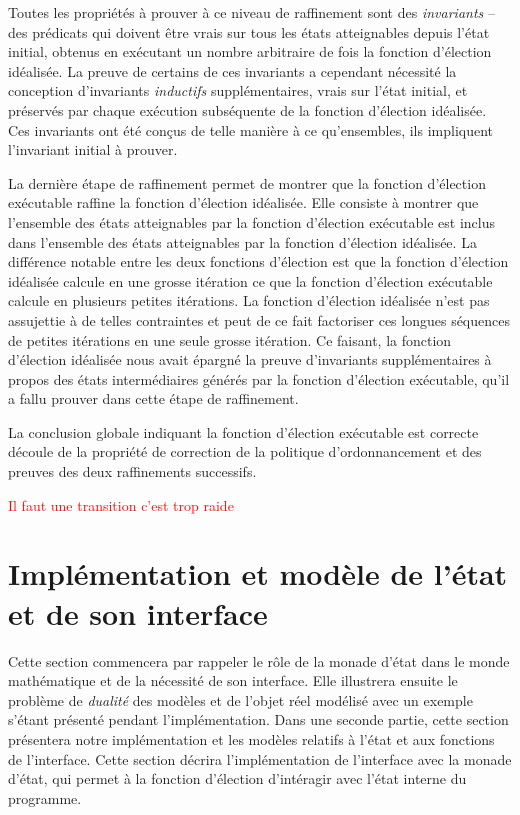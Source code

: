 	Toutes les propriétés à prouver à ce niveau de raffinement sont des \emph{invariants} -- des prédicats qui doivent être vrais sur tous les états atteignables depuis l'état initial, obtenus en exécutant un nombre arbitraire de fois la fonction d'élection idéalisée. La preuve de certains de ces invariants a cependant nécessité la conception d'invariants \emph{inductifs} supplémentaires, vrais sur l'état initial, et préservés par chaque exécution subséquente de la fonction d'élection idéalisée. Ces invariants ont été conçus de telle manière à ce qu'ensembles, ils impliquent l'invariant initial à prouver.

	La dernière étape de raffinement permet de montrer que la fonction d'élection exécutable raffine la fonction d'élection idéalisée. Elle consiste à montrer que l'ensemble des états atteignables par la fonction d'élection exécutable est inclus dans l'ensemble des états atteignables par la fonction d'élection idéalisée. 
	La différence notable entre les deux fonctions d'élection est que la fonction d'élection idéalisée calcule en une grosse itération ce que la fonction d'élection exécutable calcule en plusieurs petites itérations. La fonction d'élection idéalisée n'est pas assujettie à de telles contraintes et peut de ce fait factoriser ces longues séquences de petites itérations en une seule grosse itération. Ce faisant, la fonction d'élection idéalisée nous avait épargné la preuve d'invariants supplémentaires à propos des états intermédiaires générés par la fonction d'élection exécutable, qu'il a fallu prouver dans cette étape de raffinement.

	La conclusion globale indiquant la fonction d'élection exécutable est correcte découle de la propriété de correction de la politique d'ordonnancement et des preuves des deux raffinements successifs.

	\textcolor{red}{Il faut une transition c'est trop raide}

	\section{Implémentation et modèle de l'état et de son interface}

	Cette section commencera par rappeler le rôle de la monade d'état dans le monde mathématique et de la nécessité de son interface. Elle illustrera ensuite le problème de \emph{dualité} des modèles et de l'objet réel modélisé avec un exemple s'étant présenté pendant l'implémentation.
	Dans une seconde partie, cette section présentera notre implémentation et les modèles relatifs à l'état et aux fonctions de l'interface.
	Cette section décrira l'implémentation de l'interface avec la monade d'état, qui permet à la fonction d'élection d'intéragir avec l'état interne du programme.
